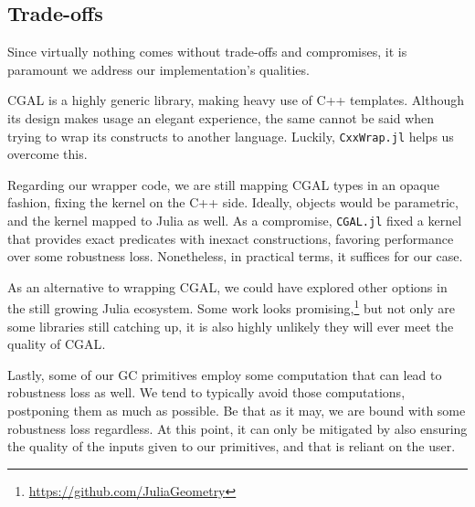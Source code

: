 \subsection{Trade-offs}%
\label{sec:solution.tradeoffs}

Since virtually nothing comes without trade-offs and compromises, it is
paramount we address our implementation's qualities.

\Ac{CGAL} is a highly generic library, making heavy use of C++ templates.
Although its design makes usage an elegant experience, the same cannot be said
when trying to wrap its constructs to another language. Luckily,
\texttt{CxxWrap.jl} helps us overcome this.

Regarding our wrapper code, we are still mapping \ac{CGAL} types in an opaque
fashion, fixing the kernel on the C++ side.  Ideally, objects would be
parametric, and the kernel mapped to Julia as well.  As a compromise,
\texttt{CGAL.jl} fixed a kernel that provides exact predicates with inexact
constructions, favoring performance over some robustness loss.  Nonetheless, in
practical terms, it suffices for our case.

As an alternative to wrapping \ac{CGAL}, we could have explored other options in
the still growing Julia ecosystem.  Some work looks
promising,\footnote{\url{https://github.com/JuliaGeometry}} but not only are
some libraries still catching up, it is also highly unlikely they will ever meet
the quality of \ac{CGAL}.

Lastly, some of our \ac{GC} primitives employ some computation that can lead to
robustness loss as well.  We tend to typically avoid those computations,
postponing them as much as possible.  Be that as it may, we are bound with some
robustness loss regardless.  At this point, it can only be mitigated by also
ensuring the quality of the inputs given to our primitives, and that is reliant
on the user.
